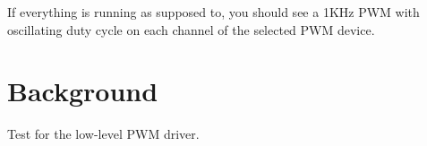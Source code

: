 If everything is running as supposed to, you should see a 1\+K\+Hz P\+WM with oscillating duty cycle on each channel of the selected P\+WM device.

\section*{Background }

Test for the low-\/level P\+WM driver. 